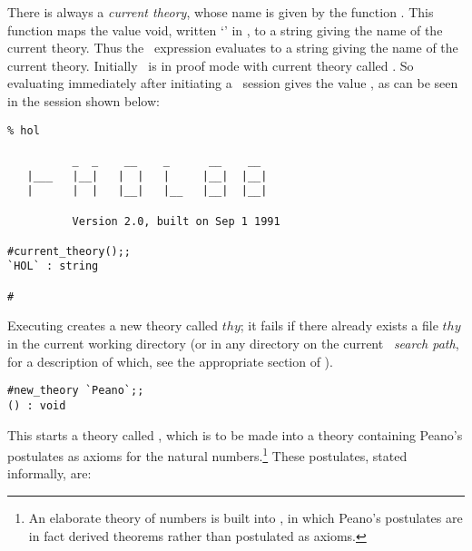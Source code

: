 There is always a {\it current theory\/}, whose name is given by the
function .  This function maps the value void,
written `\ml{()}' in \ML, to a string giving the name of the current
theory.  Thus the \ML\ expression  evaluates to
a string giving the name of the current theory.  Initially \HOL\ is in
proof mode with current theory called .  So evaluating
 immediately after initiating a \HOL\ session
gives the value , as can be seen in the session shown below:


\setcounter{sessioncount}{1}
\begin{session}\begin{verbatim}
% hol

          _  _    __    _      __    __
   |___   |__|   |  |   |     |__|  |__|
   |      |  |   |__|   |__   |__|  |__|

          Version 2.0, built on Sep 1 1991

#current_theory();;
`HOL` : string

#
\end{verbatim}\end{session}

    Executing  creates a new theory called
    $thy$; it fails if there already exists a file $thy$ in
    the current working directory (or in any directory on the current
    \HOL\ {\it search path\/}, for a description of which, see the
    appropriate section of \DESCRIPTION).

\begin{session}\begin{verbatim}
#new_theory `Peano`;;
() : void
\end{verbatim}\end{session}

\noindent This starts a theory called ,  which is  to be  made into a
theory containing Peano's postulates as axioms for the natural
numbers.\footnote{An elaborate theory of numbers is built into \HOL,
  in which Peano's postulates are in fact derived theorems rather than
  postulated as axioms.}  These postulates, stated informally, are:

